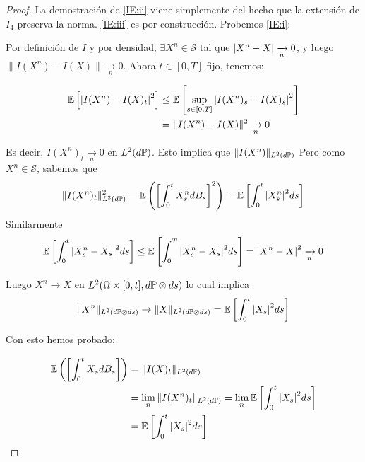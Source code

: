 \begin{proof}
\gris
La demostración de \ref{IE:ii} viene simplemente del hecho que la extensión de $I_4$ preserva la
norma. \ref{IE:iii} es por construcción. Probemos \ref{IE:i}: 

Por definición de $I$ y por densidad, $\exists X^n \in \mathcal{S}$ tal que $\abs{X^{n} - X} 
\xrightarrow[n]{} 0$, y luego $\|I(X^n) - I(X)\| \xrightarrow[n]{} 0$. Ahora $t \in [0,T]$ fijo,
tenemos: 

\begin{align*}
        \E \left[ \abs{I(X^{n}) - I(X)_t}^2 \right]
        &\le \E \left[ \sup_{s \in [0,T]} \abs{I(X^n)_s - I(X)_s}^2 \right]\\ 
        &= \|I(X^n) - I(X) \|^2 \xrightarrow[n]{} 0 
\end{align*}

Es decir, $I(X^n)_t \xrightarrow[n]{} 0$ en $L^2(d\P)$. Esto implica que $\|I(X^{n})\|_{L^2(d\P)}$ 
Pero como $X^n \in \mathcal{S}$, sabemos que 
\begin{equation*}
        \|I(X^n)_t\|^2_{L^2(d\P)} = \E \left( \left[\int_{0}^t X_s^n dB_s \right]^2 \right)
        = \E \left[ \int_{0}^t \abs{X_s^n}^2 ds \right]
\end{equation*}
Similarmente 
\begin{equation*}
        \E \left[ \int_{0}^{t} \abs{X_s^n - X_s}^2 ds \right] \le \E
                \left[ \int_{0}^{T} \abs{X_s^n - X_s}^2 ds \right] =
                \abs{X^n - X}^2 \xrightarrow[n]{} 0
\end{equation*}

Luego $X^n \to X$ en $L^2(\Omega \times [0,t], d\P \otimes ds)$ lo cual implica 
\begin{equation*}
        \|X^n\|_{L^2(d\P \otimes ds)} \to \|X\|_{L^2(d\P \otimes ds)} 
        = \E \left[ \int_{0}^t \abs{X_s}^2 ds \right]
\end{equation*}

Con esto hemos probado:

\begin{align*}
        \E \left( \left[ \int_{0}^{t} X_s dB_s \right] \right) 
        &= \|I(X)_{t}\|_{L^2(d\P)} \\
        &= \lim_{n} \|I(X^n)_t\|_{L^2(d\P)} = \lim_{n} \E \left[
                \int_{0}^{t} \abs{X_s}^2 ds \right] \\
        &= \E \left[\int_{0}^{t} \abs{X_s}^2 ds \right]
\end{align*}
\findem
\negro
\end{proof}
